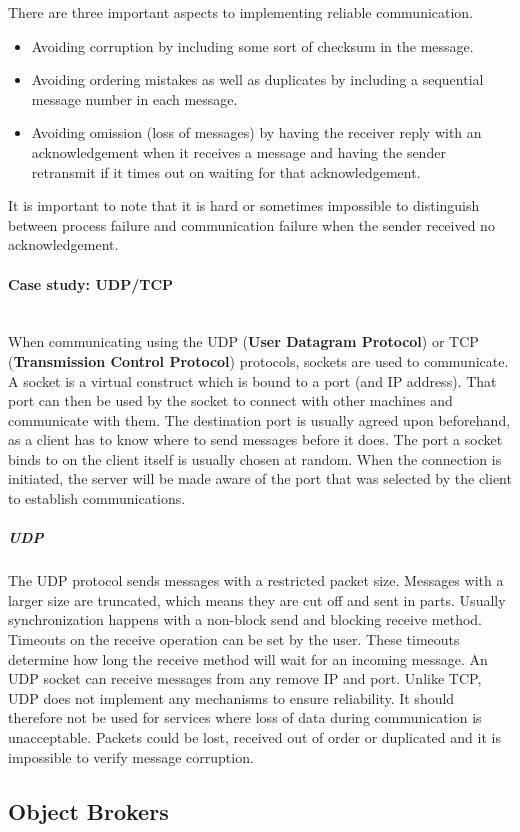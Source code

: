\documentclass[a4paper]{article}
\newcommand{\subsubsubsection}[1]{\paragraph{#1}\mbox{}\\}
\begin{document}
There are three important aspects to implementing reliable communication.

\begin{itemize}
\item Avoiding corruption by including some sort of checksum in the message.
\item Avoiding ordering mistakes as well as duplicates by including a sequential message number in each message.
\item Avoiding omission (loss of messages) by having the receiver reply with an acknowledgement when it receives a message and having the sender retransmit if it times out on waiting for that acknowledgement.
\end{itemize}

It is important to note that it is hard or sometimes impossible to distinguish between process failure and communication failure when the sender received no acknowledgement.

\subsubsubsection{Case study: UDP/TCP}

When communicating using the UDP (\textbf{User Datagram Protocol}) or TCP (\textbf{Transmission Control Protocol}) protocols, sockets are used to communicate. A socket is a virtual construct which is bound to a port (and IP address). That port can then be used by the socket to connect with other machines and communicate with them. The destination port is usually agreed upon beforehand, as a client has to know where to send messages before it does. The port a socket binds to on the client itself is usually chosen at random. When the connection is initiated, the server will be made aware of the port that was selected by the client to establish communications.

\subparagraph*{UDP} The UDP protocol sends messages with a restricted packet size. Messages with a larger size are truncated, which means they are cut off and sent in parts. Usually synchronization happens with a non-block send and blocking receive method. Timeouts on the receive operation can be set by the user. These timeouts determine how long the receive method will wait for an incoming message. An UDP socket can receive messages from any remove IP and port. Unlike TCP, UDP does not implement any mechanisms to ensure reliability. It should therefore not be used for services where loss of data during communication is unacceptable. Packets could be lost, received out of order or duplicated and it is impossible to verify message corruption.

\subsection{Object Brokers}
\end{document}
